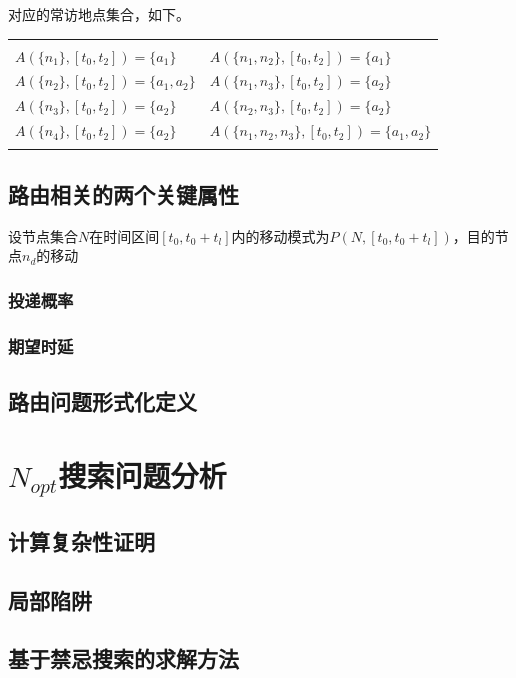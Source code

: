 对应的常访地点集合，如下。

\begin{tabular}{ll}
 & \\
$A(\{n_1\},[t_0,t_2])=\{a_1\}$ & $A(\{n_1,n_2\},[t_0,t_2])=\{a_1\}$ \\
$A(\{n_2\},[t_0,t_2])=\{a_1,a_2\}$ & $A(\{n_1,n_3\},[t_0,t_2])=\{a_2\}$ \\
$A(\{n_3\},[t_0,t_2])=\{a_2\}$ & $A(\{n_2,n_3\},[t_0,t_2])=\{a_2\}$ \\
$A(\{n_4\},[t_0,t_2])=\{a_2\}$ & $A(\{n_1,n_2,n_3\},[t_0,t_2])=\{a_1,a_2\}$ \\
 &
\end{tabular}

\subsection{路由相关的两个关键属性}
\label{chap3:路由相关的两个关键属性}

设节点集合$N$在时间区间$[t_0,t_0+t_l]$内的移动模式为$P(N,[t_0,t_0+t_l])$，目的节点$n_d$的移动

\subsubsection{投递概率}

\subsubsection{期望时延}

\subsection{路由问题形式化定义}
\label{chap3:路由问题形式化定义}

\section{$N_{opt}$搜索问题分析}
\label{chap3:搜索问题分析}

\subsection{计算复杂性证明}

\subsection{局部陷阱}

\subsection{基于禁忌搜索的求解方法}

